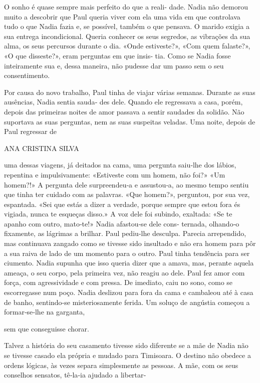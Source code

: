 O sonho é quase sempre mais perfeito do que a reali‑ dade. Nadia não
demorou muito a descobrir que Paul queria viver com ela uma vida em que
controlava tudo o que Nadia fazia e, se possível, também o que pensava.
O marido exigia a sua entrega incondicional. Queria conhecer os seus
segredos, as vibrações da sua alma, os seus percursos durante o dia.
«Onde estiveste?», «Com quem falaste?», «O que disseste?», eram
perguntas em que insis‑ tia. Como se Nadia fosse inteiramente sua e,
dessa maneira, não pudesse dar um passo sem o seu consentimento.

Por causa do novo trabalho, Paul tinha de viajar várias semanas. Durante
as suas ausências, Nadia sentia sauda‑ des dele. Quando ele regressava a
casa, porém, depois das primeiras noites de amor passava a sentir
saudades da solidão. Não suportava as suas perguntas, nem as suas
suspeitas veladas. Uma noite, depois de Paul regressar de

ANA CRISTINA SILVA

uma dessas viagens, já deitados na cama, uma pergunta saiu‑lhe dos
lábios, repentina e impulsivamente: «Estiveste com um homem, não foi?»
«Um homem?!» A pergunta dele surpreendeu‑a e assustou‑a, ao mesmo tempo
sentiu que tinha ter cuidado com as palavras. «Que homem?», perguntou,
por sua vez, espantada. «Sei que estás a dizer a verdade, porque sempre
que estou fora és vigiada, nunca te esqueças disso.» A voz dele foi
subindo, exaltada: «Se te apanho com outro, mato‑te!» Nadia afastou‑se
dele cons‑ ternada, olhando‑o fixamente, as lágrimas a brilhar. Paul
pediu‑lhe desculpa. Parecia arrependido, mas continuava zangado como se
tivesse sido insultado e não era homem para pôr a sua raiva de lado de
um momento para o outro. Paul tinha tendência para ser ciumento. Nadia
supunha que isso queria dizer que a amava, mas, perante aquela ameaça, o
seu corpo, pela primeira vez, não reagiu ao dele. Paul fez amor com
força, com agressividade e com pressa. De imediato, caiu no sono, como
se escorregasse num poço. Nadia deslizou para fora da cama e cambaleou
até à casa de banho, sentindo‑se misteriosamente ferida. Um soluço de
angústia começou a formar‑se‑lhe na garganta,

sem que conseguisse chorar.

Talvez a história do seu casamento tivesse sido diferente se a mãe de
Nadia não se tivesse casado ela própria e mudado para Timisoara. O
destino não obedece a ordens lógicas, às vezes separa simplesmente as
pessoas. A mãe, com os seus conselhos sensatos, tê‑la‑ia ajudado a
libertar‑

